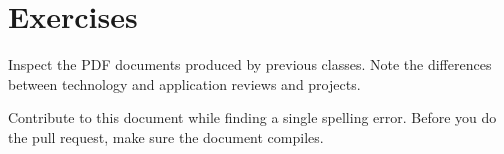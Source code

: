 \section{Exercises}
\bigskip

\begin{exercise}
\label{E:Preface.1} 
Inspect the PDF documents produced by previous
classes. Note the differences between technology and application
reviews and projects. 
\end{exercise}

\begin{exercise}
\label{E:Preface.2}
 Contribute to this document while finding a
  single spelling error. Before you do the pull request, make sure the
  document compiles.
\end{exercise}


